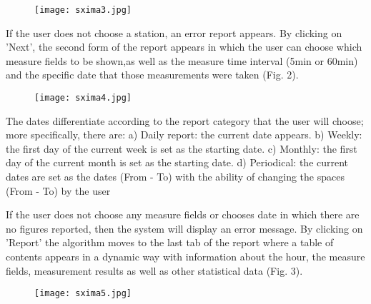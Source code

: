 \documentclass[conference]{IEEEtran}
\begin{document}
\begin{figure}[!t]
	\centering
	\texttt{[image: sxima3.jpg]}
	\caption{}
\end{figure}

If the user does not choose a station, an error report appears. By clicking on 'Next', the second form of the report appears in which the user can choose which measure fields to be shown,as well as  the measure time interval (5min or 60min) and the specific date that those measurements were taken (Fig. 2). 
\begin{figure}[!h]
	\centering
	\texttt{[image: sxima4.jpg]}
	\caption{}
\end{figure}

The dates differentiate according to the report category that the user will choose; more specifically, there are:
a)	Daily report: the current date appears.
b)	Weekly: the first day of the current week is set as the starting date.
c)	Monthly: the first day of the current month is set as the starting date.
d)	Periodical: the current dates are set as the dates (From - To) with the ability of changing the spaces (From - To) by the user


If the user does not choose any measure fields or chooses date in which there are no figures reported, then the system will display an error message. By clicking on 'Report' the algorithm moves to the last tab of the report where a table of contents appears in a dynamic way with information about the hour, the measure fields, measurement results as well as other statistical data (Fig. 3).


\begin{figure}[!h]
	\centering
	\texttt{[image: sxima5.jpg]}
     
 	\caption{}
\end{figure}
\end{document}
